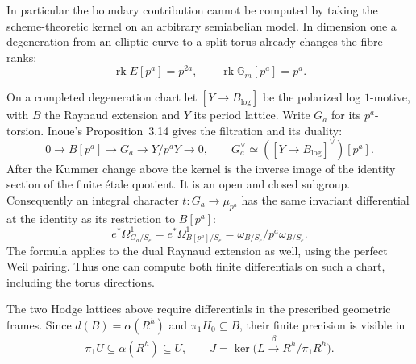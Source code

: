 In particular the boundary contribution cannot be computed by taking the scheme-theoretic kernel on an arbitrary semiabelian model. In dimension one a degeneration from an elliptic curve to a split torus already changes the fibre ranks:
\[
 \operatorname{rk} E[p^a]=p^{2a},\qquad
 \operatorname{rk}\mathbb G_m[p^a]=p^a .
\]

On a completed degeneration chart let \([Y\to B_{\log}]\) be the polarized log \(1\)-motive, with \(B\) the Raynaud extension and \(Y\) its period lattice. Write \(G_a\) for its \(p^a\)-torsion. Inoue's Proposition~3.14 gives the filtration and its duality:
\[
 0\longrightarrow B[p^a]\longrightarrow G_a
       \longrightarrow Y/p^aY\longrightarrow0,\qquad
 G_a^\vee\simeq ([Y\to B_{\log}]^\vee)[p^a].
\]
After the Kummer change above the kernel is the inverse image of the identity section of the finite \'etale quotient. It is an open and closed subgroup. Consequently an integral character \(t:G_a\to\mu_{p^a}\) has the same invariant differential at the identity as its restriction to \(B[p^a]\):
\[
 e^*\Omega^1_{G_a/S_e}=e^*\Omega^1_{B[p^a]/S_e}
                =\omega_{B/S_e}/p^a\omega_{B/S_e}.
\]
The formula applies to the dual Raynaud extension as well, using the perfect Weil pairing. Thus one can compute both finite differentials on such a chart, including the torus directions. \cite{inoue-log-flag}

The two Hodge lattices above require differentials in the prescribed geometric frames. Since \(d(B)=\alpha(R^h)\) and \(\pi_1H_0\subseteq B\), their finite precision is visible in
\[
 \pi_1 U\subseteq\alpha(R^h)\subseteq U,\qquad
 J=\ker\bigl(L\xrightarrow{\beta} R^h/\pi_1 R^h\bigr).
\]

